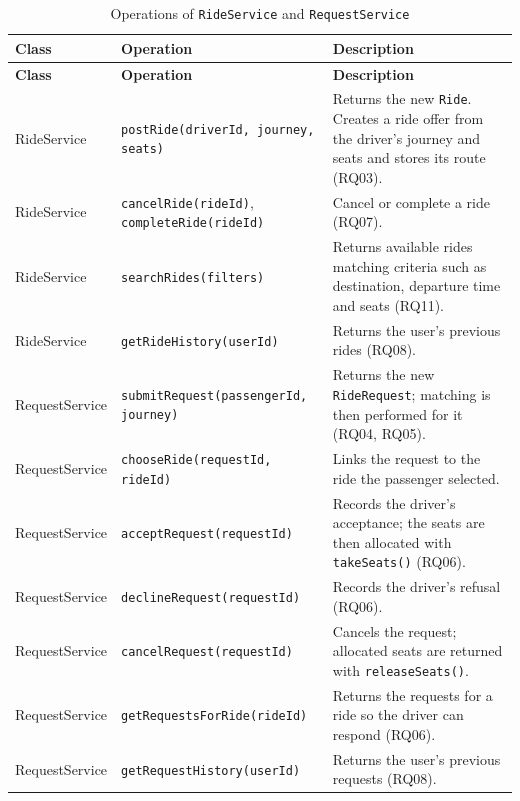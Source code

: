 \begingroup\small
\begin{longtable}{@{}>{\raggedright\arraybackslash}p{}
                   >{\raggedright\arraybackslash}p{}
                   >{\raggedright\arraybackslash}p{}@{}}
\caption{Operations of \texttt{RideService} and \texttt{RequestService}}\label{tab:serviceops}\\
\toprule
\textbf{Class} & \textbf{Operation} & \textbf{Description} \\
\midrule
\endfirsthead
\toprule
\textbf{Class} & \textbf{Operation} & \textbf{Description} \\
\midrule
\endhead
\bottomrule
\endfoot
RideService & \texttt{postRide(driverId, journey, seats)} & Returns the new \texttt{Ride}. Creates a ride offer from the driver's journey and seats and stores its route (RQ03). \\
RideService & \texttt{cancelRide(rideId)}, \texttt{completeRide(rideId)} & Cancel or complete a ride (RQ07). \\
RideService & \texttt{searchRides(filters)} & Returns available rides matching criteria such as destination, departure time and seats (RQ11). \\
RideService & \texttt{getRideHistory(userId)} & Returns the user's previous rides (RQ08). \\
RequestService & \texttt{submitRequest(passengerId, journey)} & Returns the new \texttt{RideRequest}; matching is then performed for it (RQ04, RQ05). \\
RequestService & \texttt{chooseRide(requestId, rideId)} & Links the request to the ride the passenger selected. \\
RequestService & \texttt{acceptRequest(requestId)} & Records the driver's acceptance; the seats are then allocated with \texttt{takeSeats()} (RQ06). \\
RequestService & \texttt{declineRequest(requestId)} & Records the driver's refusal (RQ06). \\
RequestService & \texttt{cancelRequest(requestId)} & Cancels the request; allocated seats are returned with \texttt{releaseSeats()}. \\
RequestService & \texttt{getRequestsForRide(rideId)} & Returns the requests for a ride so the driver can respond (RQ06). \\
RequestService & \texttt{getRequestHistory(userId)} & Returns the user's previous requests (RQ08). \\
\end{longtable}
\endgroup

